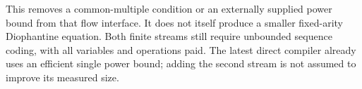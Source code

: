 This removes a common-multiple condition or an externally supplied power
bound from that flow interface. It does not itself produce a smaller
fixed-arity Diophantine equation. Both finite streams still require
unbounded sequence coding, with all variables and operations paid.
The latest direct compiler already uses an efficient single power bound;
adding the second stream is not assumed to improve its measured size.

